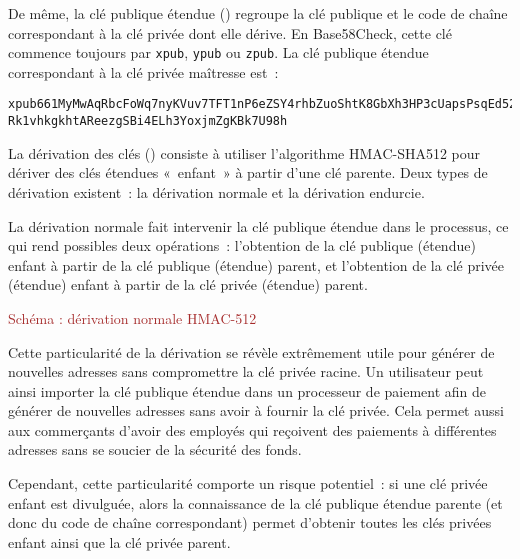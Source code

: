 De même, la clé publique étendue () regroupe la clé publique et le code de chaîne correspondant à la clé privée dont elle dérive. En Base58Check, cette clé commence toujours par \texttt{xpub}, \texttt{ypub} ou \texttt{zpub}. La clé publique étendue correspondant à la clé privée maîtresse est~:

\begin{Verbatim}[fontsize=\footnotesize]
xpub661MyMwAqRbcFoWq7nyKVuv7TFT1nP6eZSY4rhbZuoShtK8GbXh3HP3cUapsPsqEd52T
Rk1vhkgkhtAReezgSBi4ELh3YoxjmZgKBk7U98h
\end{Verbatim}


La dérivation des clés () consiste à utiliser l'algorithme HMAC-SHA512 pour dériver des clés étendues «~enfant~» à partir d'une clé parente. Deux types de dérivation existent~: la dérivation normale et la dérivation endurcie.

La dérivation normale fait intervenir la clé publique étendue dans le processus, ce qui rend possibles deux opérations~: l'obtention de la clé publique (étendue) enfant à partir de la clé publique (étendue) parent, et l'obtention de la clé privée (étendue) enfant à partir de la clé privée (étendue) parent. 

\textcolor{brown}{Schéma : dérivation normale HMAC-512}

Cette particularité de la dérivation se révèle extrêmement utile pour générer de nouvelles adresses sans compromettre la clé privée racine. Un utilisateur peut ainsi importer la clé publique étendue dans un processeur de paiement afin de générer de nouvelles adresses sans avoir à fournir la clé privée. Cela permet aussi aux commerçants d'avoir des employés qui reçoivent des paiements à différentes adresses sans se soucier de la sécurité des fonds.

Cependant, cette particularité comporte un risque potentiel~: si une clé privée enfant est divulguée, alors la connaissance de la clé publique étendue parente (et donc du code de chaîne correspondant) permet d'obtenir toutes les clés privées enfant ainsi que la clé privée parent.


